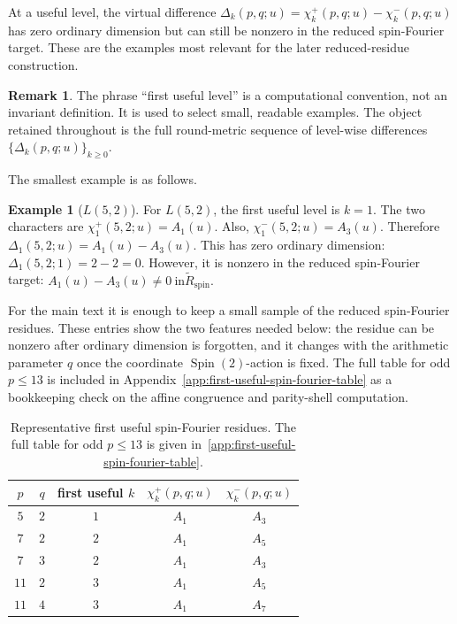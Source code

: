 \documentclass{article}
\theoremstyle{definition}
\newtheorem{example}[theorem]{Example}
\newtheorem{remark}[remark]{Remark}
\numberwithin{equation}{section}
\begin{document}
At a useful level, the virtual difference $\Delta_k(p,q;u)=\chi_k^+(p,q;u)-\chi_k^-(p,q;u)$ has zero ordinary dimension but can still be nonzero in the reduced spin-Fourier target.  These are the examples most relevant for the later reduced-residue construction.

\begin{remark}
The phrase ``first useful level'' is a computational convention, not an invariant definition.  It is used to select small, readable examples.  The object retained throughout is the full round-metric sequence of level-wise differences $\{\Delta_k(p,q;u)\}_{k\geq0}.$ \end{remark}

The smallest example is as follows.

\begin{example}[$L(5,2)$]
\label{ex:L52-stage1-canonical}
For $L(5,2)$, the first useful level is $k=1$.  The two characters are $\chi_1^+(5,2;u)=A_1(u).$ Also, $\chi_1^-(5,2;u)=A_3(u).$ Therefore $\Delta_1(5,2;u)=A_1(u)-A_3(u).$ This has zero ordinary dimension: $\Delta_1(5,2;1)=2-2=0.$ However, it is nonzero in the reduced spin-Fourier target: $A_1(u)-A_3(u)\neq 0\ \text{in} \widetilde R_{\operatorname{spin}}.$ \end{example}

For the main text it is enough to keep a small sample of the reduced spin-Fourier residues.  These entries show the two features needed below: the residue can be nonzero after ordinary dimension is forgotten, and it changes with the arithmetic parameter $q$ once the coordinate $\operatorname{Spin}(2)$-action is fixed.  The full table for odd $p\leq13$ is included in Appendix~\ref{app:first-useful-spin-fourier-table} as a bookkeeping check on the affine congruence and parity-shell computation.

\begin{table}[h]
\centering
\renewcommand{\arraystretch}{1.2}
\begin{tabular}{c|c|c|c|c}
$p$ & $q$ & first useful $k$ & $\chi_k^+(p,q;u)$ & $\chi_k^-(p,q;u)$ \\
\hline
$5$ & $2$ & $1$ & $A_1$ & $A_3$ \\
$7$ & $2$ & $2$ & $A_1$ & $A_5$ \\
$7$ & $3$ & $2$ & $A_1$ & $A_3$ \\
$11$ & $2$ & $3$ & $A_1$ & $A_5$ \\
$11$ & $4$ & $3$ & $A_1$ & $A_7$
\end{tabular}
\caption{Representative first useful spin-Fourier residues.  The full table for odd $p\leq13$ is given in~\autoref{app:first-useful-spin-fourier-table}.}
\label{tab:first-useful-spin-fourier-sample}
\end{table}
\end{document}

